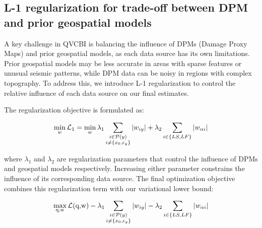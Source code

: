 \documentclass[review]{elsarticle}
\begin{document}
\subsection{L-1 regularization for trade-off between DPM and prior geospatial models}
A key challenge in QVCBI is balancing the influence of DPMs (Damage Proxy Maps) and prior geospatial models, as each data source has its own limitations. Prior geospatial models may be less accurate in areas with sparse features or unusual seismic patterns, while DPM data can be noisy in regions with complex topography. To address this, we introduce L-1 regularization to control the relative influence of each data source on our final estimates.

The regularization objective is formulated as:

\begin{equation*}
    \min_{\begin{subarray}{c}w\\\end{subarray}}\mathcal{L}_{1} =  \min_{\begin{subarray}{c}w\\\end{subarray}} \lambda_{1} \sum_{\begin{subarray}{c} i \in \mathcal{P}(y)\\ i \neq \{x_{0}, \epsilon_{y}\}\end{subarray}}|w_{iy}| + \lambda_{2} \sum_{\begin{subarray}{c}i \in \{LS,LF\}\\\end{subarray}}|w_{\alpha i}|
\end{equation*}

where $\lambda_{1}$ and $\lambda_{2}$ are regularization parameters that control the influence of DPMs and geospatial models respectively. Increasing either parameter constrains the influence of its corresponding data source. The final optimization objective combines this regularization term with our variational lower bound:

\begin{equation*}
    \max_{\begin{subarray}{c}\text{q,w}\\\end{subarray}}\mathcal{L}(\text{q,w})- \lambda_{1}\sum_{\begin{subarray}{c} i \in \mathcal{P}(y)\\ i \neq \{x_{0}, \epsilon_{y}\}\end{subarray}}|w_{iy}| - \lambda_{2} \sum_{\begin{subarray}{c}i \in \{LS,LF\}\\\end{subarray}}|w_{\alpha i}|
\end{equation*}
\end{document}
